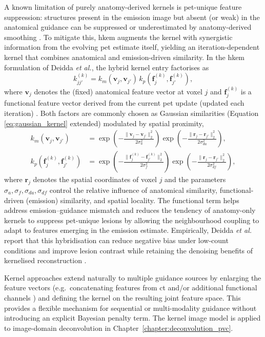 A known limitation of purely anatomy-derived kernels is \gls{pet}-unique feature suppression: structures present in the emission image but absent (or weak) in the anatomical guidance can be suppressed or underestimated by anatomy-derived smoothing \cite{deiddaHybridPETMR2019}. To mitigate this, \gls{hkem} augments the kernel with synergistic information from the evolving \gls{pet} estimate itself, yielding an iteration-dependent kernel that combines anatomical and emission-driven similarity. In the \gls{hkem} formulation of Deidda \textit{et al.}, the hybrid kernel entry factorises as
\begin{equation}
    k^{(k)}_{j j'} = k_m(\mathbf v_j,\mathbf v_{j'})\,k_p(\mathbf f^{(k)}_j,\mathbf f^{(k)}_{j'}),
\end{equation}
where $\mathbf v_j$ denotes the (fixed) anatomical feature vector at voxel $j$ and $\mathbf f^{(k)}_j$ is a functional feature vector derived from the current \gls{pet} update (updated each iteration) \cite{deiddaHybridPETMR2019}. Both factors are commonly chosen as Gaussian similarities (Equation \ref{eq:gaussian_kernel} extended) modulated by spatial proximity,
\begin{align}
    k_m(\mathbf v_j,\mathbf v_{j'}) &= \exp\!\left(-\frac{\|\mathbf v_j-\mathbf v_{j'}\|_2^2}{2\sigma_a^2}\right)
                   \exp\!\left(-\frac{\|\mathbf r_j-\mathbf r_{j'}\|_2^2}{2\sigma_{da}^2}\right),\\
    k_p(\mathbf f^{(k)}_j,\mathbf f^{(k)}_{j'}) &= \exp\!\left(-\frac{\|\mathbf f^{(k)}_j-\mathbf f^{(k)}_{j'}\|_2^2}{2\sigma_f^2}\right)
                   \exp\!\left(-\frac{\|\mathbf r_j-\mathbf r_{j'}\|_2^2}{2\sigma_{df}^2}\right),
\end{align}
where $\mathbf r_j$ denotes the spatial coordinates of voxel $j$ and the parameters $\sigma_a,\sigma_f,\sigma_{da},\sigma_{df}$ control the relative influence of anatomical similarity, functional-driven (emission) similarity, and spatial locality. The functional term helps address emission--guidance mismatch and reduces the tendency of anatomy-only kernels to suppress \gls{pet}-unique lesions by allowing the neighbourhood coupling to adapt to features emerging in the emission estimate. Empirically, Deidda \textit{et al.} report that this hybridisation can reduce negative bias under low-count conditions and improve lesion contrast while retaining the denoising benefits of kernelised reconstruction \cite{deiddaHybridPETMR2019}.

Kernel approaches extend naturally to multiple guidance sources by enlarging the feature vectors (e.g.\ concatenating features from \gls{ct} and/or additional functional channels \cite{wangPETImageReconstruction2015}) and defining the kernel on the resulting joint feature space. This provides a flexible mechanism for sequential or multi-modality guidance without introducing an explicit Bayesian penalty term. The kernel image model is applied to image-domain deconvolution in Chapter~\ref{chapter:deconvolution_pvc}.

